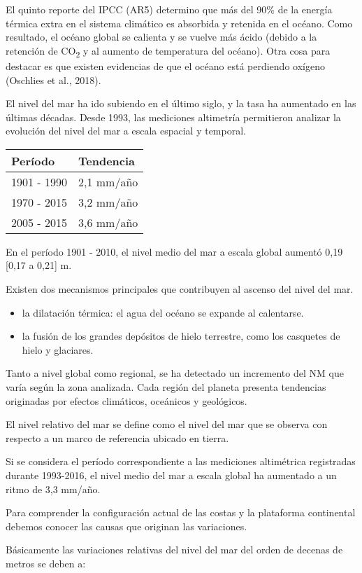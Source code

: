 \documentclass[
  a4paper,12pt]{extarticle}
\providecommand{\tightlist}{%
  \setlength{\itemsep}{0pt}\setlength{\parskip}{0pt}}
\begin{document}
El quinto reporte del IPCC (AR5) determino que más del 90\% de la
energía térmica extra en el sistema climático es absorbida y retenida en
el océano. Como resultado, el océano global se calienta y se vuelve más
ácido (debido a la retención de CO\textsubscript{2} y al aumento de
temperatura del océano). Otra cosa para destacar es que existen
evidencias de que el océano está perdiendo oxígeno (Oschlies et al.,
2018).

El nivel del mar ha ido subiendo en el último siglo, y la tasa ha
aumentado en las últimas décadas. Desde 1993, las mediciones altimetría
permitieron analizar la evolución del nivel del mar a escala espacial y
temporal.

\begin{longtable}[]{@{}ll@{}}
\toprule
Período & Tendencia\tabularnewline
\midrule
\endhead
1901 - 1990 & 2,1 mm/año\tabularnewline
1970 - 2015 & 3,2 mm/año\tabularnewline
2005 - 2015 & 3,6 mm/año\tabularnewline
\bottomrule
\end{longtable}

En el período 1901 - 2010, el nivel medio del mar a escala global
aumentó 0,19 {[}0,17 a 0,21{]} m.

Existen dos mecanismos principales que contribuyen al ascenso del nivel
del mar.

\begin{itemize}
\tightlist
\item
  la dilatación térmica: el agua del océano se expande al calentarse.
\item
  la fusión de los grandes depósitos de hielo terrestre, como los
  casquetes de hielo y glaciares.
\end{itemize}

Tanto a nivel global como regional, se ha detectado un incremento del NM
que varía según la zona analizada. Cada región del planeta presenta
tendencias originadas por efectos climáticos, oceánicos y geológicos.

El nivel relativo del mar se define como el nivel del mar que se observa
con respecto a un marco de referencia ubicado en tierra.

Si se considera el período correspondiente a las mediciones altimétrica
registradas durante 1993-2016, el nivel medio del mar a escala global ha
aumentado a un ritmo de 3,3 mm/año.

Para comprender la configuración actual de las costas y la plataforma
continental debemos conocer las causas que originan las variaciones.

Básicamente las variaciones relativas del nivel del mar del orden de
decenas de metros se deben a:
\end{document}
